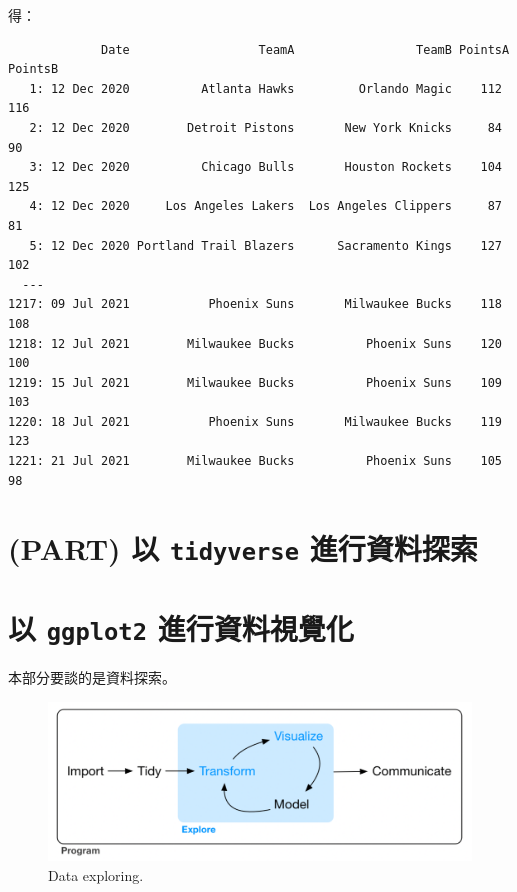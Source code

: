 \documentclass[
]{book}
\theoremstyle{definition}
\theoremstyle{remark}
\begin{document}
得：

\begin{verbatim}
             Date                  TeamA                 TeamB PointsA PointsB
   1: 12 Dec 2020          Atlanta Hawks         Orlando Magic    112      116
   2: 12 Dec 2020        Detroit Pistons       New York Knicks     84       90
   3: 12 Dec 2020          Chicago Bulls       Houston Rockets    104      125
   4: 12 Dec 2020     Los Angeles Lakers  Los Angeles Clippers     87       81
   5: 12 Dec 2020 Portland Trail Blazers      Sacramento Kings    127      102
  ---                                                                         
1217: 09 Jul 2021           Phoenix Suns       Milwaukee Bucks    118      108
1218: 12 Jul 2021        Milwaukee Bucks          Phoenix Suns    120      100
1219: 15 Jul 2021        Milwaukee Bucks          Phoenix Suns    109      103
1220: 18 Jul 2021           Phoenix Suns       Milwaukee Bucks    119      123
1221: 21 Jul 2021        Milwaukee Bucks          Phoenix Suns    105       98
\end{verbatim}

\hypertarget{part-ux4ee5-tidyverse-ux9032ux884cux8cc7ux6599ux63a2ux7d22}{%
\chapter*{\texorpdfstring{(PART) 以 \texttt{tidyverse} 進行資料探索}{(PART) 以 tidyverse 進行資料探索}}\label{part-ux4ee5-tidyverse-ux9032ux884cux8cc7ux6599ux63a2ux7d22}}

\hypertarget{ux4ee5-ggplot2-ux9032ux884cux8cc7ux6599ux8996ux89baux5316}{%
\chapter{\texorpdfstring{以 \texttt{ggplot2} 進行資料視覺化}{以 ggplot2 進行資料視覺化}}\label{ux4ee5-ggplot2-ux9032ux884cux8cc7ux6599ux8996ux89baux5316}}

本部分要談的是資料探索。

\begin{figure}

{\centering \includegraphics[width=550]{images/截圖 2021-07-24 下午3.22.11} 

}

\caption{Data exploring.}\label{fig:dataexploring}
\end{figure}
\end{document}
